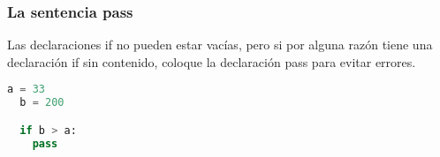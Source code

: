 \begin{frame}[fragile]
  \frametitle{La sentencia \textbf{pass}}

  Las declaraciones if no pueden estar vacías, pero si por alguna razón
  tiene una declaración if sin contenido, coloque la declaración pass
  para evitar errores. 

  \vspace{\baselineskip}
  \begin{lstlisting}[language=Python]
  a = 33
  b = 200

  if b > a:
    pass
  \end{lstlisting}
\end{frame}

